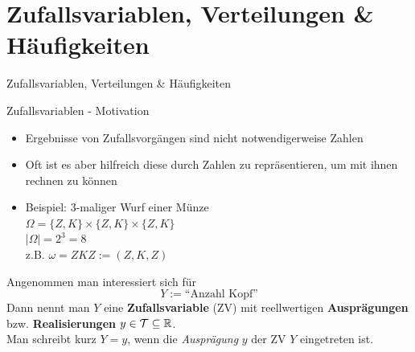\documentclass[
  10pt,
  ignorenonframetext,
]{beamer}
\begin{document}
\section{Zufallsvariablen, Verteilungen \&
Häufigkeiten}\label{zufallsvariablen-verteilungen-huxe4ufigkeiten}

\begin{frame}{Zufallsvariablen, Verteilungen \& Häufigkeiten}
\end{frame}

\begin{frame}{Zufallsvariablen - Motivation}
\label{zufallsvariablen---motivation}
\begin{itemize}
\item
  Ergebnisse von Zufallsvorgängen sind nicht notwendigerweise Zahlen\\
\item
  Oft ist es aber hilfreich diese durch Zahlen zu repräsentieren, um mit
  ihnen rechnen zu können\\
\item
  Beispiel: 3-maliger Wurf einer Münze\\
  \(\Omega = \{Z, K\} \times \{Z, K\} \times \{Z, K\}\)\\
  \(|\Omega| = 2^3 = 8\)\\
  z.B. \(\omega = ZKZ := (Z,K,Z)\)
\end{itemize}

Angenommen man interessiert sich für \[Y:=\text{``Anzahl Kopf''}\] Dann
nennt man \(Y\) eine \textbf{Zufallsvariable} (ZV) mit reellwertigen
\textbf{Ausprägungen} bzw. \textbf{Realisierungen}
\(y \in \cal{T} \subseteq \mathbb R\).\\
Man schreibt kurz \(Y=y\), wenn die \emph{Ausprägung} \(y\) der ZV \(Y\)
eingetreten ist.
\end{frame}
\end{document}
